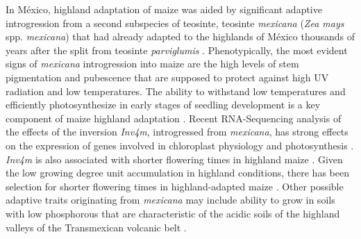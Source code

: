\documentclass[9pt,twocolumn,twoside,lineno]{BioRxiv}
\begin{document}
In México, highland adaptation of maize was aided by significant adaptive introgression from a second subspecies of teosinte, teosinte \textit{mexicana} (\textit{Zea mays} spp. \textit{mexicana}) that had already adapted to the highlands of México thousands of years after the split from teosinte \textit{parviglumis} \cite{Hufford2013-gs, Gonzalez-Segovia2019-jy}. 
Phenotypically, the most evident signs of \textit{mexicana} introgression into maize are the high levels of stem pigmentation and pubescence \cite{Lauter2004-eq} that are supposed to protect against high UV radiation and low temperatures. 
The ability to withstand low temperatures and efficiently photosynthesize in early stages of seedling development is a key component of maize highland adaptation \cite{Hardacre1980-tq}.
Recent RNA-Sequencing analysis of the effects of the inversion \textit{Inv4m}, introgressed from \textit{mexicana}, has strong effects on the expression of genes involved in chloroplast physiology and photosynthesis \cite{Crow2020-gene}.  
\textit{Inv4m} is also associated with shorter flowering times in highland maize \cite{Romero_Navarro2017-cn, Gates2019-xu}. 
Given the low growing degree unit accumulation in highland conditions, there has been selection for shorter flowering times in highland-adapted maize \cite{Gates2019-xu}. %
Other possible adaptive traits originating from \textit{mexicana} may include ability to grow in soils with low phosphorous \cite{AguirreLiguori2019-fl, Fustier2017-sl} that are characteristic of the acidic soils of the highland valleys of the Transmexican volcanic belt \cite{Krasilnikov2013-sm}.
\end{document}
